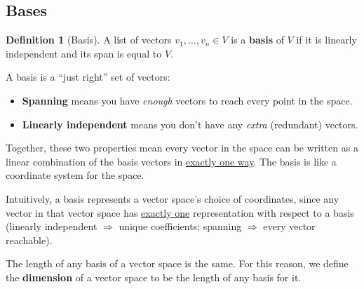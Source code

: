 \documentclass[11pt]{article}
\theoremstyle{definition}
\newtheorem{definition}{Definition}[section]
\theoremstyle{plain}
\theoremstyle{remark}
\begin{document}
\subsection{Bases}

\begin{definition}[Basis]
A list of vectors $v_1, \ldots, v_n \in V$ is a \textbf{basis} of $V$ if it is linearly independent and its span is equal to $V$.
\end{definition}

\begin{intuitionbox}
A basis is a ``just right'' set of vectors:
\begin{itemize}[nosep]
  \item \textbf{Spanning} means you have \textit{enough} vectors to reach every point in the space.
  \item \textbf{Linearly independent} means you don't have any \textit{extra} (redundant) vectors.
\end{itemize}
Together, these two properties mean every vector in the space can be written as a linear combination of the basis vectors in \underline{exactly one way}. The basis is like a coordinate system for the space.
\end{intuitionbox}

Intuitively, a basis represents a vector space's choice of coordinates, since any vector in that vector space has \underline{exactly one} representation with respect to a basis (linearly independent $\Rightarrow$ unique coefficients; spanning $\Rightarrow$ every vector reachable).

The length of any basis of a vector space is the same. For this reason, we define the \textbf{dimension} of a vector space to be the length of any basis for it.
\end{document}
